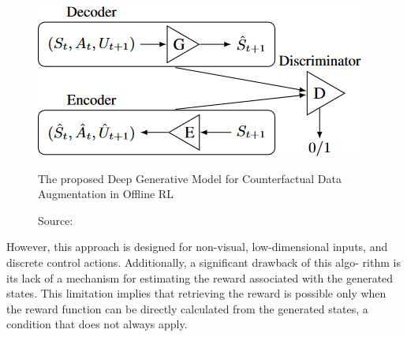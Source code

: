 \begin{figure}[h]
    \centering
    \includegraphics[width=.5\textwidth]{figures/ch2/2.rlcf.png}
    \caption{The proposed Deep Generative Model for Counterfactual Data Augmentation in Offline RL}
    \vspace{-10px}
    \caption*{\scriptsize{Source: \cite{lu2020}}}
    \label{fig:rlcf}
\end{figure}

However, this approach is designed for non-visual,
low-dimensional inputs, and discrete control
actions. Additionally, a significant drawback of this algo-
rithm is its lack of a mechanism for estimating the reward
associated with the generated states. This limitation implies
that retrieving the reward is possible only when the reward
function can be directly calculated from the generated states,
a condition that does not always apply.
